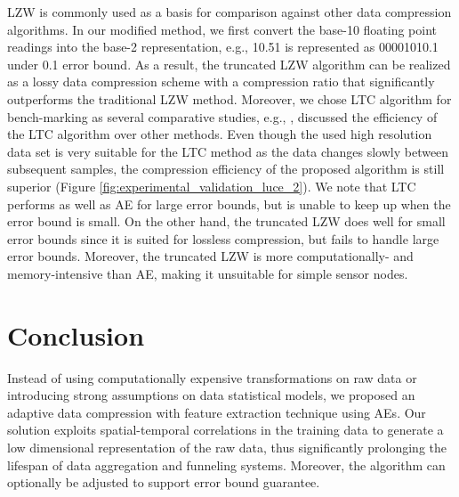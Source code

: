 \documentclass[a4paper,onecolumn,conference]{IEEEtran}
\begin{document}
LZW is commonly used as a basis for comparison against other data compression algorithms. In our modified method, we first convert the base-10 floating point readings into the base-2 representation, e.g., 10.51 is represented as 00001010.1 under 0.1 error bound. As a result, the truncated LZW algorithm can be realized as a lossy data compression scheme with a compression ratio that significantly outperforms the traditional LZW method. Moreover, we chose LTC algorithm for bench-marking as several comparative studies, e.g., \cite{zordan2012compress}, discussed the efficiency of the LTC algorithm over other methods. Even though the used high resolution data set is very suitable for the LTC method as the data changes slowly between subsequent samples, the compression efficiency of the proposed algorithm is still superior (Figure \ref{fig:experimental_validation_luce_2}). We note that LTC performs as well as AE for large error bounds, but is unable to keep up when the error bound is small. On the other hand, the truncated LZW does well for small error bounds since it is suited for lossless compression, but fails to handle large error bounds. Moreover, the truncated LZW is more computationally- and memory-intensive than AE, making it unsuitable for simple sensor nodes.

\section{Conclusion}\label{sec:conclusion}
Instead of using computationally expensive transformations on raw data or introducing strong assumptions on data statistical models, we proposed an adaptive data compression with feature extraction technique using AEs. Our solution exploits spatial-temporal correlations in the training data to generate a low dimensional representation of the raw data, thus significantly prolonging the lifespan of data aggregation and funneling systems. Moreover, the algorithm can optionally be adjusted to support error bound guarantee.


\balance

\end{document}
